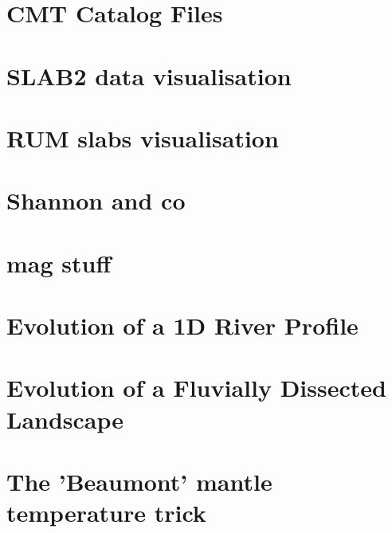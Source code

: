 \documentclass[a4paper,11pt]{report}
\begin{document}
\chapter{CMT Catalog Files\label{f134}} %

\chapter{SLAB2 data visualisation\label{f135}} %

\chapter{RUM slabs visualisation\label{f136}} %

\chapter{Shannon and co \label{f137}} %

\chapter{mag stuff \label{f138}} %

\chapter{Evolution of a 1D River Profile\label{f139}} %

\chapter{Evolution of a Fluvially Dissected Landscape \label{f140}} %

\chapter{The 'Beaumont' mantle temperature trick \label{f141}} %

\printbibliography
\end{document}

